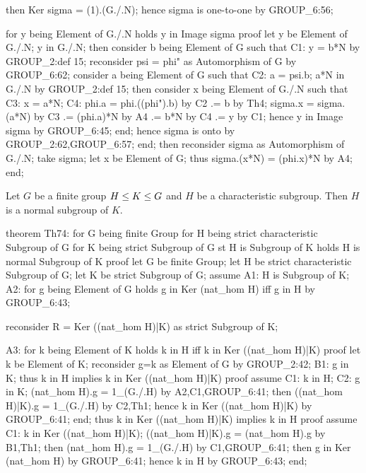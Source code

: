     then Ker sigma = (1).(G./.N);
    hence sigma is one-to-one by GROUP_6:56;

    for y being Element of G./.N holds y in Image sigma
    proof
      let y be Element of G./.N;
      y in G./.N;
      then consider b being Element of G such that
      C1: y = b*N by GROUP_2:def 15;
      reconsider psi = phi" as Automorphism of G by GROUP_6:62;
      consider a being Element of G such that
      C2: a = psi.b;
      a*N in G./.N by GROUP_2:def 15;
      then consider x being Element of G./.N such that
      C3: x = a*N;
      C4: phi.a = phi.((phi").b) by C2
               .= b by Th4;
      sigma.x = sigma.(a*N) by C3
             .= (phi.a)*N by A4
             .= b*N by C4
             .= y by C1;
      hence y in Image sigma by GROUP_6:45;
    end;
    hence sigma is onto by GROUP_2:62,GROUP_6:57;
  end;
  then reconsider sigma as Automorphism of G./.N;
  take sigma;
  let x be Element of G;
  thus sigma.(x*N) = (phi.x)*N by A4;
end;
\eatline
{}\nwendcode{}\nwdocspar
\begin{theorem}
Let $G$ be a finite group $H\leq K\leq G$ and $H$ be a characteristic
subgroup. Then $H$ is a normal subgroup of $K$.
\end{theorem}

\nwenddocs{}\endmoddef\nwstartdeflinemarkup{}\nwenddeflinemarkup
theorem Th74:
  for G being finite Group
  for H being strict characteristic Subgroup of G
  for K being strict Subgroup of G
  st H is Subgroup of K
  holds H is normal Subgroup of K
proof
  let G be finite Group;
  let H be strict characteristic Subgroup of G;
  let K be strict Subgroup of G;
  assume A1: H is Subgroup of K;
  A2: for g being Element of G
  holds g in Ker (nat_hom H) iff g in H by GROUP_6:43;

  reconsider R = Ker ((nat_hom H)|K) as strict Subgroup of K;

  A3: for k being Element of K
  holds k in H iff k in Ker ((nat_hom H)|K)
  proof
    let k be Element of K;
    reconsider g=k as Element of G by GROUP_2:42;
    B1: g in K;
    thus k in H implies k in Ker ((nat_hom H)|K)
    proof
      assume C1: k in H;
      C2: g in K;
      (nat_hom H).g = 1_(G./.H) by A2,C1,GROUP_6:41;
      then ((nat_hom H)|K).g = 1_(G./.H) by C2,Th1;
      hence k in Ker ((nat_hom H)|K) by GROUP_6:41;
    end;
    thus k in Ker ((nat_hom H)|K) implies k in H
    proof
      assume C1: k in Ker ((nat_hom H)|K);
      ((nat_hom H)|K).g = (nat_hom H).g by B1,Th1;
      then (nat_hom H).g = 1_(G./.H) by C1,GROUP_6:41;
      then g in Ker (nat_hom H) by GROUP_6:41;
      hence k in H by GROUP_6:43;
    end;

